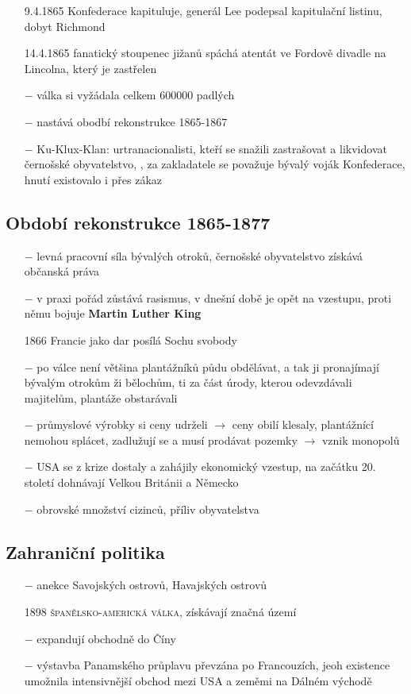 \documentclass{article}
\begin{document}
\begin{itemize}
    \item[9.4.1865] Konfederace kapituluje, generál Lee podepsal kapitulační listinu, dobyt Richmond
    \item[14.4.1865] fanatický stoupenec jižanů spáchá atentát ve Fordově divadle na Lincolna, který je zastřelen
    \item[$-$] válka si vyžádala celkem 600000 padlých
    \item[$-$] nastává obodbí rekonstrukce 1865-1867
    \item[$-$] Ku-Klux-Klan: urtranacionalisti, kteří se snažili zastrašovat a likvidovat černošské obyvatelstvo, , za zakladatele se považuje bývalý voják Konfederace, hnutí existovalo i přes zákaz
\end{itemize}

\subsection*{Období rekonstrukce 1865-1877}
\begin{itemize}
    \vspace{-0.5em}
    \setlength\itemsep{0.15em}
    \item[$-$] levná pracovní síla bývalých otroků, černošské obyvatelstvo získává občanská práva
    \item[$-$] v praxi pořád zůstává rasismus, v dnešní době je opět na vzestupu, proti němu bojuje \textbf{Martin Luther King}
    \item[1866] Francie jako dar posílá Sochu svobody
    \item[$-$] po válce není většina plantážníků půdu obdělávat, a tak ji pronajímají bývalým otrokům ži bělochům, ti za část úrody, kterou odevzdávali majitelům, plantáže obstarávali
    \item[$-$] průmyslové výrobky si ceny udrželi $\rightarrow$ ceny obilí klesaly, plantážnící nemohou splácet, zadlužují se a musí prodávat pozemky $\rightarrow$ vznik monopolů
    \item[$-$] USA se z krize dostaly a zahájily ekonomický vzestup, na začátku 20. století dohnávají Velkou Británii a Německo
    \item[$-$] obrovské množství cizinců, příliv obyvatelstva

\end{itemize}


\subsection*{Zahraniční politika}
\begin{itemize}
    \vspace{-0.5em}
    \setlength\itemsep{0.15em}
    \item[$-$] anekce Savojských ostrovů, Havajských ostrovů
    \item[1898] \textsc{španělsko-americká válka}, získávají značná území
    \item[$-$] expandují obchodně do Číny
    \item[$-$] výstavba Panamského průplavu převzána po Francouzích, jeoh existence umožnila intensivnější obchod mezi USA a zeměmi na Dálném východě
\end{itemize}
\end{document}
